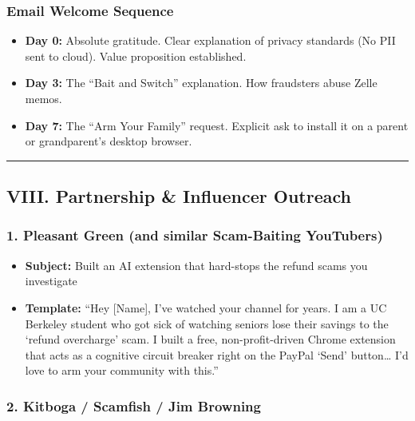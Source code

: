 \documentclass[
]{article}
\providecommand{\tightlist}{%
  \setlength{\itemsep}{0pt}\setlength{\parskip}{0pt}}
\begin{document}
\subsubsection{Email Welcome Sequence}\label{email-welcome-sequence}

\begin{itemize}
\tightlist
\item
  \textbf{Day 0:} Absolute gratitude. Clear explanation of privacy
  standards (No PII sent to cloud). Value proposition established.
\item
  \textbf{Day 3:} The ``Bait and Switch'' explanation. How fraudsters
  abuse Zelle memos.
\item
  \textbf{Day 7:} The ``Arm Your Family'' request. Explicit ask to
  install it on a parent or grandparent's desktop browser.
\end{itemize}

\begin{center}\rule{0.5\linewidth}{0.5pt}\end{center}

\subsection{VIII. Partnership \& Influencer
Outreach}\label{viii.-partnership-influencer-outreach}

\subsubsection{1. Pleasant Green (and similar Scam-Baiting
YouTubers)}\label{pleasant-green-and-similar-scam-baiting-youtubers}

\begin{itemize}
\tightlist
\item
  \textbf{Subject:} Built an AI extension that hard-stops the refund
  scams you investigate
\item
  \textbf{Template:} ``Hey {[}Name{]}, I've watched your channel for
  years. I am a UC Berkeley student who got sick of watching seniors
  lose their savings to the `refund overcharge' scam. I built a free,
  non-profit-driven Chrome extension that acts as a cognitive circuit
  breaker right on the PayPal `Send' button\ldots{} I'd love to arm your
  community with this.''
\end{itemize}

\subsubsection{2. Kitboga / Scamfish / Jim
Browning}\label{kitboga-scamfish-jim-browning}
\end{document}
